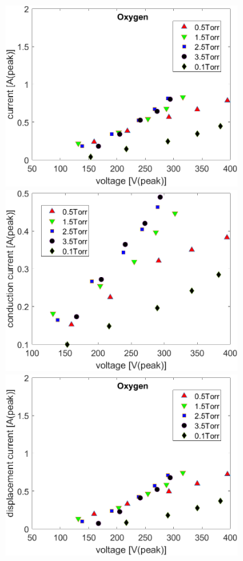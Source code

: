 \documentclass[12pt]{iopart}
\begin{document}
\begin{figure}[ht!]
\begin{center}
\begin{minipage}{0.495\textwidth}
\end{minipage}
\begin{minipage}{0.495\textwidth}
    \includegraphics[width=0.8\textwidth]{O2current_volts.png}
\end{minipage}
\begin{minipage}{0.495\textwidth}
    \includegraphics[width=0.8\textwidth]{O2conduction_volts.png}
\end{minipage}
\begin{minipage}{0.495\textwidth}
    \includegraphics[width=0.8\textwidth]{O2disp_volts.png}
\end{minipage}

\caption{} 

\label{Fig:gap_SV,pressure_TB,species_TB}
\end{center}
\end{figure}
\end{document}
